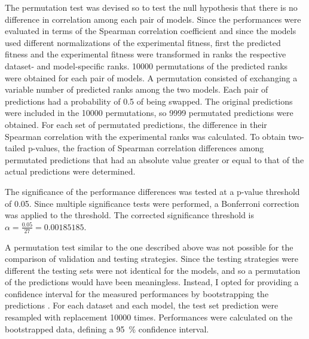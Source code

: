 The permutation test was devised so to test the null hypothesis that there is no difference in correlation among each pair of models.
Since the performances were evaluated in terms of the Spearman correlation coefficient and since the models used different normalizations of the experimental fitness, first the predicted fitness and the experimental fitness were transformed in ranks the respective dataset- and model-specific ranks.
\num{10000} permutations of the predicted ranks were obtained for each pair of models.
A permutation consisted of exchanging a variable number of predicted ranks among the two models.
Each pair of predictions had a probability of 0.5 of being swapped.
The original predictions were included in the \num{10000} permutations, so \num{9999} permutated predictions were obtained.
For each set of permutated predictions, the difference in their Spearman correlation with the experimental ranks was calculated.
To obtain two-tailed p-values, the fraction of Spearman correlation differences among permutated predictions that had an absolute value greater or equal to that of the actual predictions were determined.

The significance of the performance differences was tested at a p-value threshold of \num{0.05}.
Since multiple significance tests were performed, a Bonferroni correction \parencite{Dunn1961} was applied to the threshold.
The corrected significance threshold is $\alpha = \frac{0.05}{27} = 0.00185185$.

A permutation test similar to the one described above was not possible for the comparison of validation and testing strategies.
Since the testing strategies were different the testing sets were not identical for the models, and so a permutation of the predictions would have been meaningless.
Instead, I opted for providing a confidence interval for the measured performances by bootstrapping the predictions \parencite{Davison1999}.
For each dataset and each model, the test set prediction were resampled with replacement \num{10000} times.
Performances were calculated on the bootstrapped data, defining a \SI{95}{\percent} confidence interval.
